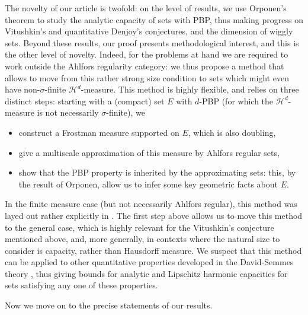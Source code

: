 \documentclass[11pt,reqno]{amsart}
\theoremstyle{definition}
\theoremstyle{remark}
\numberwithin{equation}{section}
\newcommand{\dH}{\mathcal{H}}
\theoremstyle{theorem}
\theoremstyle{definition}
\theoremstyle{remark}
\numberwithin{equation}{section}
\begin{document}
\vspace{0.5em}
The novelty of our article is twofold: on the level of results, we use Orponen's theorem to study the analytic capacity of sets with PBP, thus making progress on Vitushkin's and quantitative Denjoy's conjectures, and the dimension of wiggly sets. Beyond these results, our proof presents methodological interest, and this is the other level of novelty. Indeed, for the problems at hand we are required to work outside the Ahlfors regularity category: we thus propose a method that allows to move from this rather strong size condition to sets which might even have non-$\sigma$-finite $\dH^d$-measure. This method is highly flexible, and relies on three distinct steps: starting with a (compact) set $E$ with $d$-PBP (for which the $\dH^d$-measure is not necessarily $\sigma$-finite), we
\begin{itemize}\label{program}
    \item construct a Frostman measure supported on $E$, which is also doubling,
    \item give a multiscale approximation of this measure by Ahlfors regular sets,
    \item show that the PBP property is inherited by the approximating sets: this, by the result of Orponen, allow us to infer some key geometric facts about $E$.
\end{itemize}
In the finite measure case (but not necessarily Ahlfors regular), this method was layed out rather explicitly in \cite{azzam2019quantitative}. The first step above allows us to move this method to the general case, which is highly relevant for the Vitushkin's conjecture mentioned above, and, more generally, in contexts where the natural size to consider is capacity, rather than Hausdorff measure. We suspect that this method can be applied to other quantitative properties developed in the David-Semmes theory \cite{david1991singular,david1993analysis}, thus giving bounds for analytic and Lipschitz harmonic capacities for sets satisfying any one of these properties.

Now we move on to the precise statements of our results.
	
\end{document}
